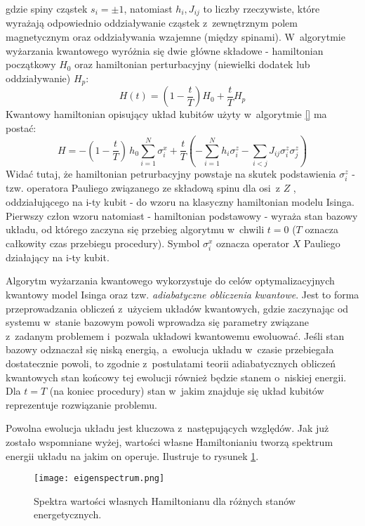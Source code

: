 \documentclass[12pt,a4paper,twoside,openany]{book}
\begin{document}
\noindent gdzie spiny cząstek $s_i = \pm1$, natomiast $h_i, J_{ij}$ to liczby rzeczywiste, które  wyrażają odpowiednio oddziaływanie cząstek z~zewnętrznym polem magnetycznym oraz oddziaływania wzajemne (między spinami). 
\newpage \noindent W~algorytmie wyżarzania kwantowego wyróżnia się dwie główne składowe - hamiltonian początkowy $H_0$ oraz hamiltonian perturbacyjny (niewielki dodatek lub oddziaływanie) $H_p$:
\begin{equation}
   H(t) = \left(1-\frac{t}{T}\right) H_0 + \frac{t}{T}H_p
\end{equation}
Kwantowy hamiltonian opisujący układ kubitów użyty w~algorytmie \ref{} ma postać:
\begin{equation}
    H = -(1-\frac{t}{T})\, h_0\sum^N_{i=1}\sigma^x_i + \frac{t}{T}(-\sum_{i=1}^Nh_i\sigma^z_i - \sum_{i<j}J_{ij}\sigma^z_i\sigma^z_j) 
\end{equation}
Widać tutaj, że hamiltonian petrurbacyjny powstaje na skutek podstawienia $\sigma^z_i$ - tzw. operatora Pauliego związanego ze składową spinu dla osi~z $Z$ , oddziałującego na i-ty kubit - do wzoru na klasyczny hamiltonian modelu Isinga.
Pierwszy człon wzoru natomiast - hamiltonian podstawowy - wyraża stan bazowy układu, od którego zaczyna się przebieg algorytmu w~chwili $t = 0$ ($T$ oznacza całkowity czas przebiegu procedury).
Symbol $\sigma^x_i$ oznacza operator $X$ Pauliego działający na i-ty kubit.

Algorytm wyżarzania kwantowego wykorzystuje do celów optymalizacyjnych kwantowy model Isinga oraz tzw. \textit{adiabatyczne obliczenia kwantowe}. 
Jest to forma przeprowadzania obliczeń z~użyciem układów  kwantowych, gdzie zaczynając od systemu w~stanie bazowym powoli wprowadza się parametry związane z~zadanym problemem i~pozwala układowi kwantowemu ewoluować. 
Jeśli stan bazowy odznaczał się niską energią, a~ewolucja układu w~czasie przebiegała dostatecznie powoli, to zgodnie z~postulatami teorii adiabatycznych obliczeń kwantowych stan końcowy tej ewolucji również będzie stanem o~niskiej energii.
Dla $t = T$ (na koniec procedury) stan w~jakim znajduje się układ kubitów reprezentuje rozwiązanie problemu.

Powolna ewolucja układu jest kluczowa z~następujących względów. 
Jak już zostało wspomniane wyżej, wartości własne Hamiltonianiu tworzą spektrum energii układu na jakim on operuje. 
Ilustruje to rysunek \ref{eigenspectrum}.

\begin{figure}[h!]
\texttt{[image: eigenspectrum.png]}
\caption{Spektra wartości własnych Hamiltonianu dla różnych stanów energetycznych.}
\label{eigenspectrum}
\end{figure}
\end{document}

